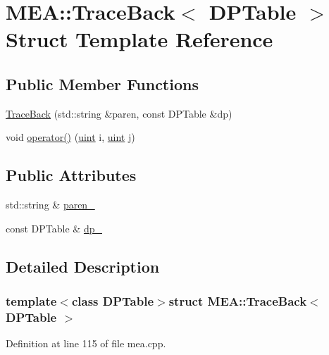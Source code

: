 \hypertarget{struct_m_e_a_1_1_trace_back}{\section{M\+E\+A\+:\+:Trace\+Back$<$ D\+P\+Table $>$ Struct Template Reference}
\label{struct_m_e_a_1_1_trace_back}
}
\subsection*{Public Member Functions}
\begin{DoxyCompactItemize}
\item 
\hyperlink{struct_m_e_a_1_1_trace_back_a83b4933d3cbb6da9dd71ec1c32850b7f}{Trace\+Back} (std\+::string \&paren, const D\+P\+Table \&dp)
\item 
void \hyperlink{struct_m_e_a_1_1_trace_back_a7dd36888fae1163c4aad8fdcfd7707eb}{operator()} (\hyperlink{cyktable_8h_a91ad9478d81a7aaf2593e8d9c3d06a14}{uint} i, \hyperlink{cyktable_8h_a91ad9478d81a7aaf2593e8d9c3d06a14}{uint} j)
\end{DoxyCompactItemize}
\subsection*{Public Attributes}
\begin{DoxyCompactItemize}
\item 
std\+::string \& \hyperlink{struct_m_e_a_1_1_trace_back_a86a5e7ad5ef04abaaa689c174ae3dc07}{paren\+\_\+}
\item 
const D\+P\+Table \& \hyperlink{struct_m_e_a_1_1_trace_back_a0bdabdc1f5a2a42895b8d0ca92163c95}{dp\+\_\+}
\end{DoxyCompactItemize}


\subsection{Detailed Description}
\subsubsection*{template$<$class D\+P\+Table$>$struct M\+E\+A\+::\+Trace\+Back$<$ D\+P\+Table $>$}



Definition at line 115 of file mea.\+cpp.



